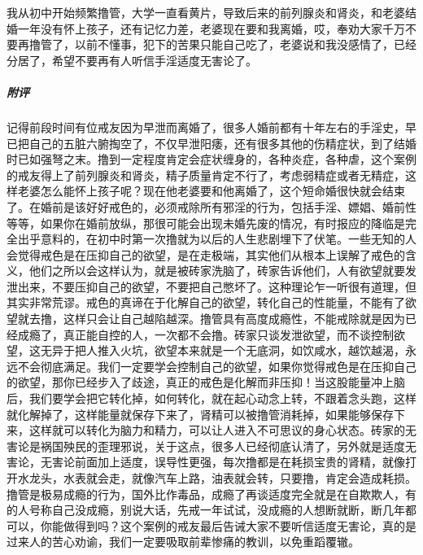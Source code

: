 \begin{case}
    我从初中开始频繁撸管，大学一直看黄片，导致后来的前列腺炎和肾炎，和老婆结婚一年没有怀上孩子，还有记忆力差，老婆现在要和我离婚，哎，奉劝大家千万不要再撸管了，以前不懂事，犯下的苦果只能自己吃了，老婆说和我没感情了，已经分居了，希望不要再有人听信手淫适度无害论了。
    \subparagraph{附评} 记得前段时间有位戒友因为早泄而离婚了，很多人婚前都有十年左右的手淫史，早已把自己的五脏六腑掏空了，不仅早泄阳痿，还有很多其他的伤精症状，到了结婚时已如强弩之末。撸到一定程度肯定会症状缠身的，各种炎症，各种虐，这个案例的戒友得上了前列腺炎和肾炎，精子质量肯定不行了，考虑弱精症或者无精症，这样老婆怎么能怀上孩子呢？现在他老婆要和他离婚了，这个短命婚很快就会结束了。在婚前是该好好戒色的，必须戒除所有邪淫的行为，包括手淫、嫖娼、婚前性等等，如果你在婚前放纵，那很可能会出现未婚先废的情况，有时报应的降临是完全出乎意料的，在初中时第一次撸就为以后的人生悲剧埋下了伏笔。一些无知的人会觉得戒色是在压抑自己的欲望，是在走极端，其实他们从根本上误解了戒色的含义，他们之所以会这样认为，就是被砖家洗脑了，砖家告诉他们，人有欲望就要发泄出来，不要压抑自己的欲望，不要把自己憋坏了。这种理论乍一听很有道理，但其实非常荒谬。戒色的真谛在于化解自己的欲望，转化自己的性能量，不能有了欲望就去撸，这样只会让自己越陷越深。撸管具有高度成瘾性，不能戒除就是因为已经成瘾了，真正能自控的人，一次都不会撸。砖家只谈发泄欲望，而不谈控制欲望，这无异于把人推入火坑，欲望本来就是一个无底洞，如饮咸水，越饮越渴，永远不会彻底满足。我们一定要学会控制自己的欲望，如果你觉得戒色是在压抑自己的欲望，那你已经步入了歧途，真正的戒色是化解而非压抑！当这股能量冲上脑后，我们要学会把它转化掉，如何转化，就在起心动念上转，不跟着念头跑，这样就化解掉了，这样能量就保存下来了，肾精可以被撸管消耗掉，如果能够保存下来，这样就可以转化为脑力和精力，可以让人进入不可思议的身心状态。砖家的无害论是祸国殃民的歪理邪说，关于这点，很多人已经彻底认清了，另外就是适度无害论，无害论前面加上适度，误导性更强，每次撸都是在耗损宝贵的肾精，就像打开水龙头，水表就会走，就像汽车上路，油表就会转，只要撸，肯定会造成耗损。撸管是极易成瘾的行为，国外比作毒品，成瘾了再谈适度完全就是在自欺欺人，有的人号称自己没成瘾，别说大话，先戒一年试试，没成瘾的人想断就断，断几年都可以，你能做得到吗？这个案例的戒友最后告诫大家不要听信适度无害论，真的是过来人的苦心劝谕，我们一定要吸取前辈惨痛的教训，以免重蹈覆辙。
\end{case}

